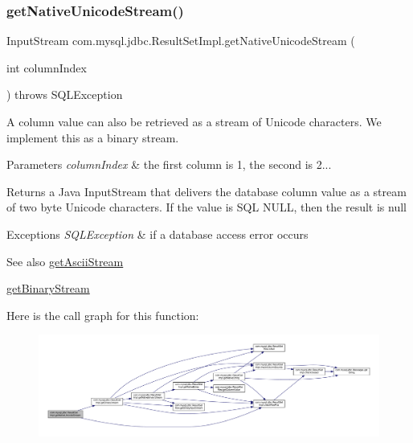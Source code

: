 \subsubsection{\texorpdfstring{get\+Native\+Unicode\+Stream()}{getNativeUnicodeStream()}}
{\footnotesize\ttfamily Input\+Stream com.\+mysql.\+jdbc.\+Result\+Set\+Impl.\+get\+Native\+Unicode\+Stream (\begin{DoxyParamCaption}\item[{int}]{column\+Index }\end{DoxyParamCaption}) throws S\+Q\+L\+Exception\hspace{0.3cm}{\ttfamily [protected]}}

A column value can also be retrieved as a stream of Unicode characters. We implement this as a binary stream.


\begin{DoxyParams}{Parameters}
{\em column\+Index} & the first column is 1, the second is 2...\\
\hline
\end{DoxyParams}
\begin{DoxyReturn}{Returns}
a Java Input\+Stream that delivers the database column value as a stream of two byte Unicode characters. If the value is S\+QL N\+U\+LL, then the result is null
\end{DoxyReturn}

\begin{DoxyExceptions}{Exceptions}
{\em S\+Q\+L\+Exception} & if a database access error occurs\\
\hline
\end{DoxyExceptions}
\begin{DoxySeeAlso}{See also}
\mbox{\hyperlink{classcom_1_1mysql_1_1jdbc_1_1_result_set_impl_a3121b8b483b8b8bfcdf6b1b977a60808}{get\+Ascii\+Stream}} 

\mbox{\hyperlink{classcom_1_1mysql_1_1jdbc_1_1_result_set_impl_a59faa6b2172c9dafdc26ea397bc4fc93}{get\+Binary\+Stream}} 
\end{DoxySeeAlso}
Here is the call graph for this function\+:
\nopagebreak
\begin{figure}[H]
\begin{center}
\leavevmode
\includegraphics[width=350pt]{classcom_1_1mysql_1_1jdbc_1_1_result_set_impl_a83d3f3839270765b9b934fc524a0e04e_cgraph}
\end{center}
\end{figure}
\mbox{\label{classcom_1_1mysql_1_1jdbc_1_1_result_set_impl_a71324cfb1aabc0ba2a5a6ba0ddb165c5}} 
